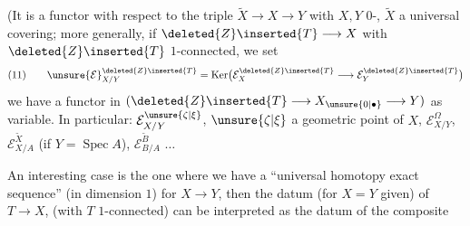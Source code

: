 
(It is a functor with respect to the triple $\widetilde X\longrightarrow X\longrightarrow Y$ with $X,Y$ $0$-, $\widetilde X$ a universal covering; more generally, if $\deleted{Z}\inserted{T}\longrightarrow X$ with $\deleted{Z}\inserted{T}$ $1$-connected, we set
\[
(11)\qquad \unsure{\mathcal E}_{X/Y}^{\deleted{Z}\inserted{T}}=\operatorname{Ker}\bigl(\mathcal E_X^{\deleted{Z}\inserted{T}}\longrightarrow\mathcal E_Y^{\deleted{Z}\inserted{T}}\bigr)
\]
we have a functor in  $(\deleted{Z}\inserted{T}\longrightarrow X_{\unsure{0|\bullet}}\longrightarrow Y)$ as variable. In particular: $\mathcal E_{X/Y}^{\unsure{\zeta|\xi}}$, $\unsure{\zeta|\xi}$ a geometric point of $X$, $\mathcal E_{X/Y}^{\Omega}$, $\mathcal E_{X/A}^{\widetilde X}$ (if $Y=\operatorname{Spec} A$), $\mathcal E_{B/A}^{\widetilde B}$ $\ldots$


An interesting case is the one where we have a ``universal homotopy exact sequence''  (in dimension $1$) for $X\longrightarrow Y$, then the datum (for $X=Y$ given) of $T\longrightarrow X$, (with $T$ $1$-connected) can be interpreted as the datum of the composite

